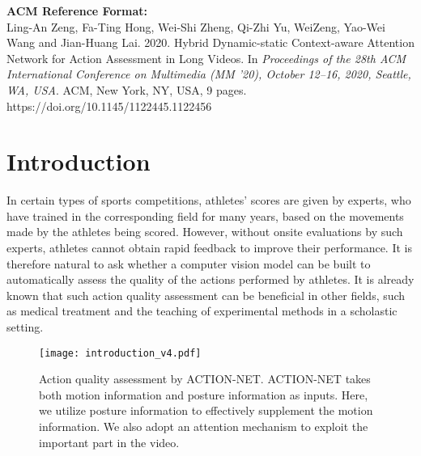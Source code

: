 \documentclass[sigconf]{acmart}
\begin{document}

\vspace{-0.2cm}
\vspace{-0.2cm}





\maketitle


\vspace{-0.2cm}

{\small\textbf{ACM Reference Format:} \\
Ling-An Zeng, Fa-Ting Hong, Wei-Shi Zheng, Qi-Zhi Yu, WeiZeng,  Yao-Wei  Wang and Jian-Huang Lai.  2020.  Hybrid  Dynamic-static Context-aware Attention Network for Action Assessment in Long Videos. In \emph{Proceedings of the 28th ACM International Conference on Multimedia (MM ’20), October 12–16, 2020, Seattle, WA, USA}. ACM, New York, NY, USA, 9 pages. https://doi.org/10.1145/1122445.1122456}



\section{Introduction}



In certain types of sports competitions, athletes' scores are given by experts, who have trained in the corresponding field for many years, based on the movements made by the athletes being scored. However, without onsite evaluations by such experts, athletes cannot obtain rapid feedback to improve their performance. It is therefore natural to ask whether a computer vision model can be built to automatically assess the quality of the actions performed by athletes. It is already known that such action quality assessment can be beneficial in other fields, such as medical treatment and the teaching of experimental methods in a scholastic setting.

\begin{figure}
    \centering
    \texttt{[image: introduction\_v4.pdf]}
\vspace{-0.3cm}
\caption{Action quality assessment by ACTION-NET. ACTION-NET takes both motion information and posture information as inputs. Here, we utilize posture information to effectively supplement the motion information. We also adopt an attention mechanism to exploit the important part in the video.
}
    \label{Introduction}
\vspace{-0.5cm}
\end{figure}
\end{document}
